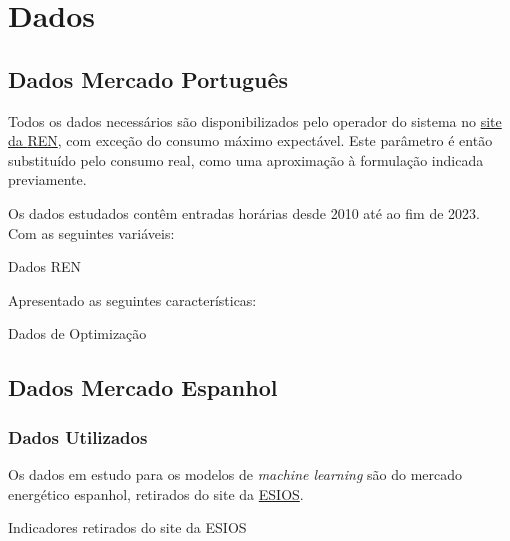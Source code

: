 \newpage
\section{Dados}

\subsection{Dados Mercado Português\label{se:dados_pt}}

Todos os dados necessários são disponibilizados pelo operador do sistema no \href{https://mercado.ren.pt/PT/Electr}{site da \gls{REN}}, com exceção do consumo máximo expectável. Este parâmetro é então substituído pelo consumo real, como uma aproximação à formulação indicada previamente.\par
Os dados estudados contêm entradas horárias desde 2010 até ao fim de 2023. Com as seguintes variáveis:\\

\begin{table}[H] \centering \caption{Dados REN}  \end{table}

Apresentado as seguintes características:\par
\begin{table}[H]
    \centering
    \caption{Dados de Optimização}    
    \resizebox{0.7\linewidth}{!}{}
    \end{table}


\subsection{Dados Mercado Espanhol\label{se:dados_es}}


\subsubsection{Dados Utilizados\label{se:dadosestudo}}

Os dados em estudo para os modelos de \textit{machine learning} são do mercado energético espanhol, retirados do site da \href{https://www.esios.ree.es/es}{\gls{ESIOS}}.


\begin{table}[H]
    \centering
    \caption{Indicadores retirados do site da ESIOS}    
\end{table}



